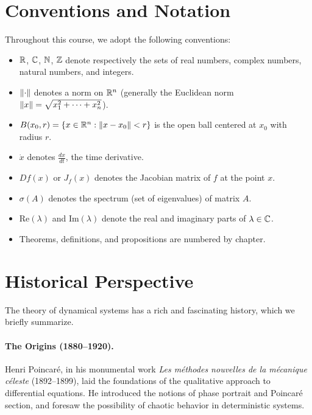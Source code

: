 \section*{Conventions and Notation}

Throughout this course, we adopt the following conventions:

\begin{itemize}
    \item $\mathbb{R}$, $\mathbb{C}$, $\mathbb{N}$, $\mathbb{Z}$ denote respectively the sets of real numbers,
    complex numbers, natural numbers, and integers.

    \item $\left\| \cdot \right\|$ denotes a norm on $\mathbb{R}^n$ (generally the Euclidean
    norm $\left\| x \right\| = \sqrt{x_1^2 + \cdots + x_n^2}$).

    \item $B(x_0, r) = \{x \in \mathbb{R}^n : \left\| x - x_0 \right\| < r\}$ is the open ball
    centered at $x_0$ with radius $r$.

    \item $\dot{x}$ denotes $\frac{dx}{dt}$, the time derivative.

    \item $Df(x)$ or $J_f(x)$ denotes the Jacobian matrix of $f$ at the
    point $x$.

    \item $\sigma(A)$ denotes the spectrum (set of eigenvalues) of matrix $A$.

    \item $\text{Re}(\lambda)$ and $\text{Im}(\lambda)$ denote the real and
    imaginary parts of $\lambda \in \mathbb{C}$.

    \item Theorems, definitions, and propositions are numbered by chapter.
\end{itemize}

\section*{Historical Perspective}

The theory of dynamical systems has a rich and fascinating history, which we
briefly summarize.

\paragraph{The Origins (1880--1920).}
Henri Poincar\'e, in his monumental work \emph{Les m\'ethodes nouvelles de la
m\'ecanique c\'eleste} (1892--1899), laid the foundations of the qualitative
approach to differential equations. He introduced the notions of phase
portrait and Poincar\'e section, and foresaw the possibility of chaotic
behavior in deterministic systems.

